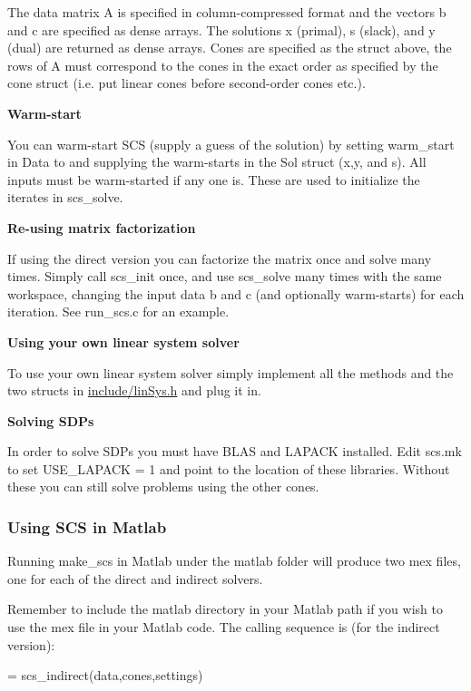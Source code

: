The data matrix {\ttfamily A} is specified in column-\/compressed format and the vectors {\ttfamily b} and {\ttfamily c} are specified as dense arrays. The solutions {\ttfamily x} (primal), {\ttfamily s} (slack), and {\ttfamily y} (dual) are returned as dense arrays. Cones are specified as the struct above, the rows of {\ttfamily A} must correspond to the cones in the exact order as specified by the cone struct (i.\-e. put linear cones before second-\/order cones etc.).

{\bfseries Warm-\/start}

You can warm-\/start S\-C\-S (supply a guess of the solution) by setting warm\-\_\-start in Data to {} and supplying the warm-\/starts in the Sol struct ({\ttfamily x},{\ttfamily y}, and {\ttfamily s}). All inputs must be warm-\/started if any one is. These are used to initialize the iterates in {\ttfamily scs\-\_\-solve}.

{\bfseries Re-\/using matrix factorization}

If using the direct version you can factorize the matrix once and solve many times. Simply call scs\-\_\-init once, and use {\ttfamily scs\-\_\-solve} many times with the same workspace, changing the input data {\ttfamily b} and {\ttfamily c} (and optionally warm-\/starts) for each iteration. See run\-\_\-scs.\-c for an example.

{\bfseries Using your own linear system solver}

To use your own linear system solver simply implement all the methods and the two structs in {\ttfamily \hyperlink{lin_sys_8h}{include/lin\-Sys.\-h}} and plug it in.

{\bfseries Solving S\-D\-Ps}

In order to solve S\-D\-Ps you must have B\-L\-A\-S and L\-A\-P\-A\-C\-K installed. Edit {\ttfamily scs.\-mk} to set {\ttfamily U\-S\-E\-\_\-\-L\-A\-P\-A\-C\-K = 1} and point to the location of these libraries. Without these you can still solve problems using the other cones.

\subsubsection*{Using S\-C\-S in Matlab}

Running {\ttfamily make\-\_\-scs} in Matlab under the {\ttfamily matlab} folder will produce two mex files, one for each of the direct and indirect solvers.

Remember to include the {\ttfamily matlab} directory in your Matlab path if you wish to use the mex file in your Matlab code. The calling sequence is (for the indirect version)\-: \begin{DoxyVerb}[x,y,s,info] = scs_indirect(data,cones,settings)
\end{DoxyVerb}



